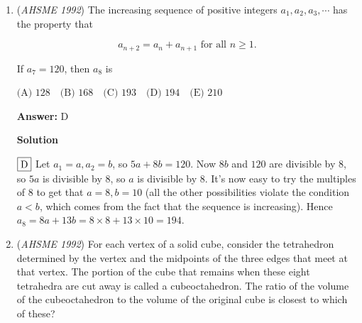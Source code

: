 \begin{enumerate}
 Now, let's compute all of our sums 
 \[7 \cdot \sum_{n=1}^{9} n = 7 \cdot 45 = 315\] 
 \[10 \cdot \sum_{n=2}^{8} n = 10 \cdot 35= 350\] and $1+9+9+9+1+9+2$ is regrouped to 
 \[4 \cdot 9+4 = 40\]Now, our total digit sum should be: 
 \[315+350+40 = 665+40 =705\]Now that we have the total digit sum, we can tell it's divisible by 3, since $7+5 = 12$ 
 \[12 \equiv 0 \pmod{3}\] So $705 \equiv 0 \pmod{3}$ 

 Let's try to factor out groups of $3$ 
 \[705 = 3 \cdot 235\] Now, to pull another $3$ out from $235$, $235$ must be divisible by 3. 
 \[2+3+5 = 10\] so 
 \[235 \equiv 1 \pmod{3}\] $235$ is not divisible by $3$.

 Therefore, the greatest power of $3$ the given integer is divisible by is $3 = 3^1$ 

 Thus, $k=1 \implies \boxed{B}$



	\item (\textit{AHSME 1992}) The increasing sequence of positive integers $a_1,a_2,a_3,\cdots$ has the property that


 
 \[a_{n+2}=a_n+a_{n+1} \text{  for all } n\ge 1.\]


 If $a_7=120$, then $a_8$ is


 $\text{(A) } 128\quad \text{(B) } 168\quad \text{(C) } 193\quad \text{(D) } 194\quad \text{(E) } 210$

 \textbf{Answer: }D



\textbf{Solution}

$\fbox{D}$ Let $a_{1} = a, a_{2} = b$, so $5a + 8b = 120$. Now $8b$ and $120$ are divisible by $8$, so $5a$ is divisible by 8, so $a$ is divisible by 8. It's now easy to try the multiples of $8$ to get that $a = 8, b=10$ (all the other possibilities violate the condition $a < b$, which comes from the fact that the sequence is increasing). Hence $a_8 = 8a + 13b = 8 \times 8 + 13 \times 10 = 194$.

 


	\item (\textit{AHSME 1992}) For each vertex of a solid cube, consider the tetrahedron determined by the vertex and the midpoints of the three edges that meet at that vertex. The portion of the cube that remains when these eight tetrahedra are cut away is called a cubeoctahedron. The ratio of the volume of the cubeoctahedron to the volume of the original cube is closest to which of these?



\end{enumerate}
